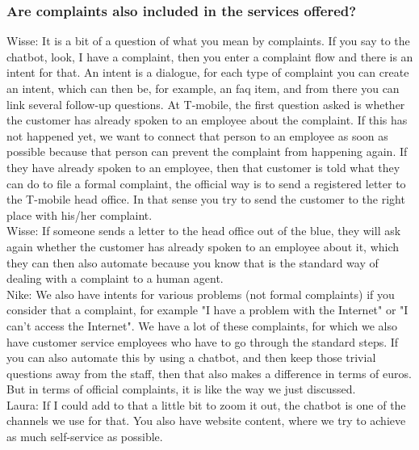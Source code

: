 \begin{appendices}
	\subsubsection{Are complaints also included in the services offered?}
	Wisse: It is a bit of a question of what you mean by complaints. If you say to the chatbot, look, I have a complaint, then you enter a complaint flow and there is an intent for that. An intent is a dialogue, for each type of complaint you can create an intent, which can then be, for example, an \acrshort{faq} item, and from there you can link several follow-up questions. At T-mobile, the first question asked is whether the customer has already spoken to an employee about the complaint. If this has not happened yet, we want to connect that person to an employee as soon as possible because that person can prevent the complaint from happening again. If they have already spoken to an employee, then that customer is told what they can do to file a formal complaint, the official way is to send a registered letter to the T-mobile head office. In that sense you try to send the customer to the right place with his/her complaint.\\
	\break
	Wisse: If someone sends a letter to the head office out of the blue, they will ask again whether the customer has already spoken to an employee about it, which they can then also automate because you know that is the standard way of dealing with a complaint to a human agent.\\
	\break
	Nike: We also have intents for various problems (not formal complaints) if you consider that a complaint, for example "I have a problem with the Internet" or "I can't access the Internet". We have a lot of these complaints, for which we also have customer service employees who have to go through the standard steps. If you can also automate this by using a chatbot, and then keep those trivial questions away from the staff, then that also makes a difference in terms of euros. But in terms of official complaints, it is like the way we just discussed.\\
	\break
	Laura: If I could add to that a little bit to zoom it out, the chatbot is one of the channels we use for that. You also have website content, where we try to achieve as much self-service as possible.
	

\end{appendices}

